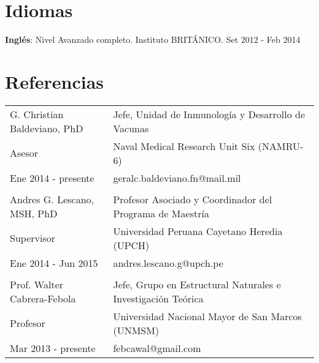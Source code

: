 \documentclass[margin,line]{res}
\begin{document}
\begin{resume}
		
		\section{\sc Idiomas}
		{\bf Inglés}: Nivel Avanzado completo. Instituto BRITÁNICO. \hfill {Set 2012 - Feb 2014} \\
		
		
		\section{\sc Referencias}
		
		\begin{tabular}{ l l }
			G. Christian Baldeviano, PhD & Jefe, Unidad de Inmunología y Desarrollo de Vacunas\\
			Asesor & Naval Medical Research Unit Six (NAMRU-6)\\
			Ene 2014 - presente & geralc.baldeviano.fn@mail.mil\\
			&\\
			Andres G. Lescano, MSH, PhD & Profesor Asociado y Coordinador del Programa de Maestría\\
			Supervisor & Universidad Peruana Cayetano Heredia (UPCH)\\
			Ene 2014 - Jun 2015 & andres.lescano.g@upch.pe\\
			&\\
			Prof. Walter Cabrera-Febola & Jefe, Grupo en Estructural Naturales e Investigación Teórica\\
			Profesor & Universidad Nacional Mayor de San Marcos (UNMSM)\\
			Mar 2013 - presente & febcawal@gmail.com\\	
		\end{tabular}
		
		
		
		
		
		
		
		

\end{resume}
\end{document}
